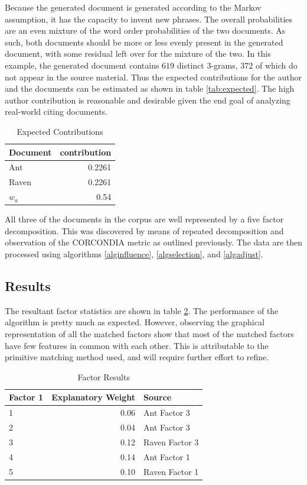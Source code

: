 \documentclass{article}
\begin{document}
Because the generated document is generated according to the Markov
assumption, it has the capacity to invent new phrases.  The overall
probabilities are an even mixture of the word order probabilities of
the two documents.  As such, both documents should be more or less
evenly present in the generated document, with some residual left over
for the mixture of the two.  In this example, the generated document
contains $619$ distinct 3-grams, $372$ of which do not appear in the
source material.  Thus the expected contributions for the author and
the documents can be estimated as shown in table \ref{tab:expected}. The
high author contribution is reasonable and desirable given the end
goal of analyzing real-world citing documents.

\begin{table}
    \label{tab:Expected}
    \begin{tabular}{l|r}
    {\bf Document} & {\bf contribution} \\
    \hline
    Ant &  0.2261 \\
    Raven & 0.2261 \\
    $w_a$ & 0.54 \\
    \end{tabular}
    \caption{Expected Contributions}
\end{table}

All three of the documents in the corpus are well represented by
a five factor decomposition. This was discovered by means of repeated
decomposition and observation of the CORCONDIA metric as outlined
previously.  The data are then processed using algorithms
\ref{alginfluence}, \ref{algselection}, and \ref{algadjust}.

\subsection{Results}
The resultant factor statistics are shown in table \ref{tab:results}.  The
performance of the algorithm is pretty much as expected.  However,
observing the graphical representation of all the matched factors show
that most of the matched factors have few features in common with each
other.  This is attributable to the primitive matching method used,
and will require further effort to refine.

\begin{table}
    \label{tab:results}
    \begin{tabular}{l|r|l}
        {\bf Factor 1} & {\bf Explanatory Weight} & {Source}\\
        \hline
        1 & 0.06 & Ant Factor 3\\
        2 & 0.04 & Ant Factor 3\\
        3 & 0.12 & Raven Factor 3\\
        4 & 0.14 & Ant Factor 1\\
        5 & 0.10 & Raven Factor 1\\
    \end{tabular}
    \caption{Factor Results}
\end{table}
\end{document}
